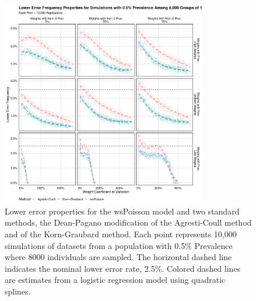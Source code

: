 \documentclass[AMA,STIX1COL]{WileyNJD-v2}
\begin{document}
\begin{figure}
\centering
\includegraphics[width=0.8\textwidth]{figures/perfect_lower_error_frequency_8000_groups_0_005_prev.pdf}
\caption{Lower error properties for the wsPoisson model and two standard methods, the Dean-Pagano modification of the Agresti-Coull method and of the Korn-Graubard method.
Each point represents 10,000 simulations of datasets from a population with 0.5\% Prevalence where 8000 individuals are sampled.
The horizontal dashed line indicates the nominal lower error rate, 2.5\%.
Colored dashed lines are estimates from a logistic regression model using quadratic splines.}
\label{fig:perfect_lower_error_frequency_8000_groups_0_005_prev}
\end{figure}
\end{document}
